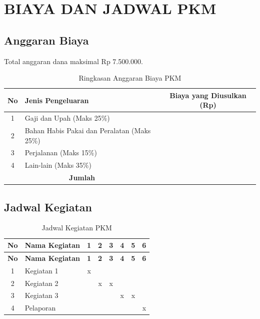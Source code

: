 \clearpage
\section{BIAYA DAN JADWAL PKM}

\subsection{Anggaran Biaya}
Total anggaran dana maksimal Rp 7.500.000.

\begin{table}[h]
    \caption{Ringkasan Anggaran Biaya PKM}
    \centering
    \begin{tabularx}{\textwidth}{|c|X|c|}
        \hline
        \textbf{No} & \textbf{Jenis Pengeluaran} & \textbf{Biaya yang Diusulkan (Rp)} \\ \hline
        1 & Gaji dan Upah (Maks 25\%) & \\ \hline
        2 & Bahan Habis Pakai dan Peralatan (Maks 25\%) & \\ \hline
        3 & Perjalanan (Maks 15\%) & \\ \hline
        4 & Lain-lain (Maks 35\%) & \\ \hline
        \multicolumn{2}{|c|}{\textbf{Jumlah}} & \\ \hline
    \end{tabularx}
\end{table}

\subsection{Jadwal Kegiatan}
\begin{longtable}{|c|p{6cm}|c|c|c|c|c|c|}
    \caption{Jadwal Kegiatan PKM}\label{tab:jadwal}\\
    \hline
    \textbf{No} & \textbf{Nama Kegiatan} & \textbf{1} & \textbf{2} & \textbf{3} & \textbf{4} & \textbf{5} & \textbf{6} \\ \hline
    \endfirsthead

    \hline
    \textbf{No} & \textbf{Nama Kegiatan} & \textbf{1} & \textbf{2} & \textbf{3} & \textbf{4} & \textbf{5} & \textbf{6} \\ \hline
    \endhead

    1 & Kegiatan 1 & x & & & & & \\ \hline
    2 & Kegiatan 2 & & x & x & & & \\ \hline
    3 & Kegiatan 3 & & & & x & x & \\ \hline
    4 & Pelaporan & & & & & & x \\ \hline
\end{longtable}
